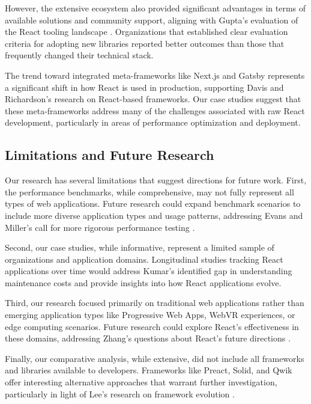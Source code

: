 However, the extensive ecosystem also provided significant advantages in terms of available solutions and community support, aligning with Gupta's evaluation of the React tooling landscape \cite{gupta2021}. Organizations that established clear evaluation criteria for adopting new libraries reported better outcomes than those that frequently changed their technical stack.

The trend toward integrated meta-frameworks like Next.js \cite{nextjs2016} and Gatsby \cite{gatsby2017} represents a significant shift in how React is used in production, supporting Davis \cite{davis2019} and Richardson's \cite{richardson2021} research on React-based frameworks. Our case studies suggest that these meta-frameworks address many of the challenges associated with raw React development, particularly in areas of performance optimization and deployment.

\subsection{Limitations and Future Research}
Our research has several limitations that suggest directions for future work. First, the performance benchmarks, while comprehensive, may not fully represent all types of web applications. Future research could expand benchmark scenarios to include more diverse application types and usage patterns, addressing Evans and Miller's call for more rigorous performance testing \cite{evans2022}.

Second, our case studies, while informative, represent a limited sample of organizations and application domains. Longitudinal studies tracking React applications over time would address Kumar's identified gap in understanding maintenance costs \cite{kumar2022} and provide insights into how React applications evolve.

Third, our research focused primarily on traditional web applications rather than emerging application types like Progressive Web Apps, WebVR experiences, or edge computing scenarios. Future research could explore React's effectiveness in these domains, addressing Zhang's questions about React's future directions \cite{zhang2022}.

Finally, our comparative analysis, while extensive, did not include all frameworks and libraries available to developers. Frameworks like Preact, Solid, and Qwik offer interesting alternative approaches that warrant further investigation, particularly in light of Lee's research on framework evolution \cite{lee2022}.


